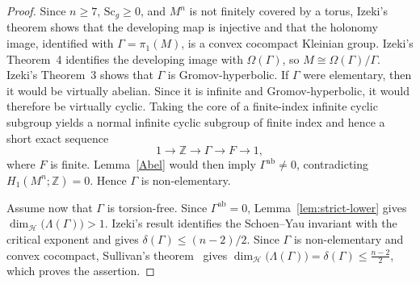 \documentclass[12pt,oneside,a4paper]{article}
\theoremstyle{mytheorem}
\theoremstyle{remark}
\theoremstyle{definition}
\begin{document}
\begin{proof}
Since $n\geq7$, $\mathrm{Sc}_g\geq0$, and $M^n$ is not finitely covered
by a torus, Izeki's theorem \cite[Theorem~2(2)]{zbMATH01785298} shows that the
developing map is injective and that the holonomy image, identified with
$\Gamma=\pi_1(M)$, is a convex cocompact Kleinian group. Izeki's
Theorem~4 identifies the developing image with $\Omega(\Gamma)$, so
$M\cong\Omega(\Gamma)/\Gamma$. Izeki's Theorem~3 shows that $\Gamma$ is
Gromov-hyperbolic.
If $\Gamma$ were elementary, then it would be virtually abelian. Since it is
infinite and Gromov-hyperbolic, it would therefore be virtually cyclic.
Taking the core of a finite-index infinite cyclic subgroup yields a normal
infinite cyclic subgroup of finite index and hence a short exact sequence
\[
1\longrightarrow\mathbb Z\longrightarrow\Gamma\longrightarrow F
\longrightarrow1,
\]
where $F$ is finite. Lemma~\ref{Abel} would then imply
$\Gamma^{\mathrm{ab}}\neq0$, contradicting
$H_1(M^n;\mathbb Z)=0$. Hence $\Gamma$ is non-elementary.

Assume now that $\Gamma$ is torsion-free. Since
$\Gamma^{\mathrm{ab}}=0$, Lemma~\ref{lem:strict-lower} gives
$\dim_{\mathcal H}\!\bigl(\Lambda(\Gamma)\bigr)>1.$ Izeki's result
\cite[Theorem~4]{zbMATH01785298} identifies the
Schoen--Yau invariant with the critical exponent and gives
\(\delta(\Gamma)\leq(n-2)/2\). Since \(\Gamma\) is non-elementary and
convex cocompact, Sullivan's theorem~\cite{zbMATH03903608} gives
$\dim_{\mathcal H}\!\bigl(\Lambda(\Gamma)\bigr)=\delta(\Gamma)\leq\frac{n-2}{2}$,
which proves the assertion.
\end{proof}
\end{document}
